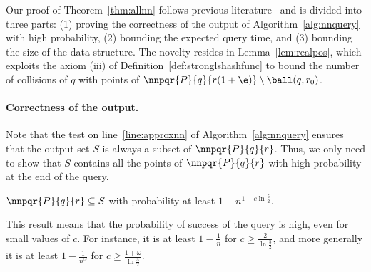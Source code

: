 Our proof of Theorem~\ref{thm:allnn} follows previous
literature~\cite{HarPeledIndykMotwani} and is divided into three
parts: (1) proving the correctness of the output of
Algorithm~\ref{alg:nnquery} with high probability, (2) bounding the
expected query time, and (3) bounding the size of the data
structure. The novelty resides in Lemma~\ref{lem:realpos}, which
exploits the axiom (iii) of Definition~\ref{def:stronglshashfunc} to
bound the number of collisions of $q$ with points of
$\nnpqr{P}{q}{r(1+\e)}\setminus\ball(q,r_0)$.

\paragraph{Correctness of the output.}
\label{sec:A_correct}
Note that the test on line~\ref{line:approxnn} of
Algorithm~\ref{alg:nnquery} ensures that the output set $S$ is
always a subset of $\nnpqr{P}{q}{r}$. Thus, we only need to show that
$S$ contains all the points of $\nnpqr{P}{q}{r}$ with high probability
at the end of the query.
\begin{lem} \label{lem:success}
$\nnpqr{P}{q}{r}\subseteq S$ with probability at least
  $1-n^{1-c\ln\frac{5}{2}}$. 
\end{lem}
This result means that the probability of success of the query is
high, even for small values of $c$. For instance, it is at least
$1-\frac{1}{n}$ for $c\geq \frac{2}{\ln\frac{5}{2}}$, and more
generally it is at least $1-\frac{1}{n^\omega}$ for $c\geq
\frac{1+\omega}{\ln\frac{5}{2}}$.
